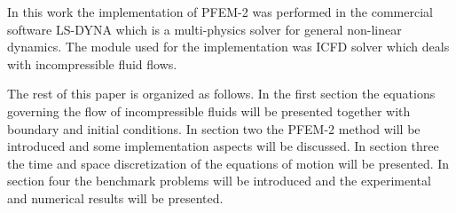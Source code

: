 In this work the implementation of PFEM-2 was performed in the commercial software LS-DYNA\textsuperscript{\textregistered} \cite{lsdyna} which is a multi-physics solver for general non-linear dynamics. The module used for the implementation was ICFD solver which deals with incompressible fluid flows. 

The rest of this paper is organized as follows. 
In the first section the equations governing the flow of incompressible fluids will be presented together with boundary and initial conditions. 
In section two the PFEM-2 method will be introduced and some implementation aspects will be discussed.
In section three the time and space discretization of the equations of motion will be presented. 
In section four the benchmark problems will be introduced and the experimental and numerical results will be presented.
